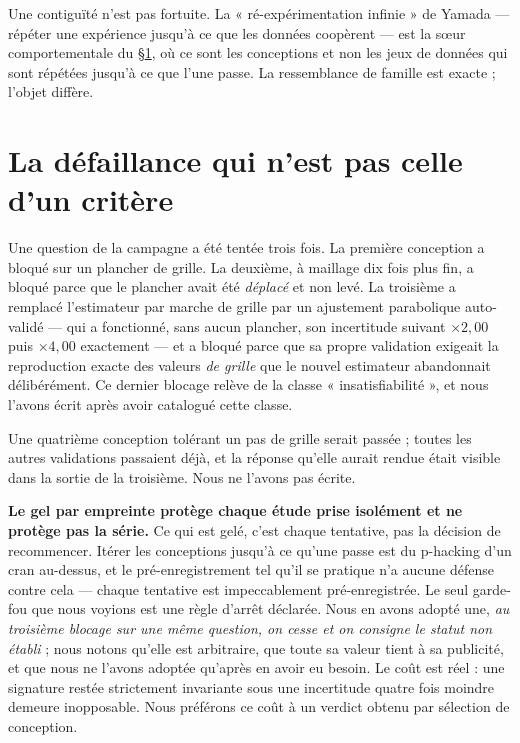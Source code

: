 \documentclass[11pt,a4paper]{article}
\begin{document}
Une contiguïté n'est pas fortuite. La « ré-expérimentation infinie » de Yamada --- répéter une
expérience jusqu'à ce que les données coopèrent --- est la sœur comportementale du
\S\ref{sec:serie}, où ce sont les conceptions et non les jeux de données qui sont répétées
jusqu'à ce que l'une passe. La ressemblance de famille est exacte ; l'objet diffère.

\section{La défaillance qui n'est pas celle d'un critère}
\label{sec:serie}

Une question de la campagne a été tentée trois fois. La première conception a bloqué sur un
plancher de grille. La deuxième, à maillage dix fois plus fin, a bloqué parce que le plancher
avait été \emph{déplacé} et non levé. La troisième a remplacé l'estimateur par marche de
grille par un ajustement parabolique auto-validé --- qui a fonctionné, sans aucun plancher,
son incertitude suivant $\times2{,}00$ puis $\times4{,}00$ exactement --- et a bloqué parce que
sa propre validation exigeait la reproduction exacte des valeurs \emph{de grille} que le nouvel
estimateur abandonnait délibérément. Ce dernier blocage relève de la classe
« insatisfiabilité », et nous l'avons écrit après avoir catalogué cette classe.

Une quatrième conception tolérant un pas de grille serait passée ; toutes les autres
validations passaient déjà, et la réponse qu'elle aurait rendue était visible dans la sortie de
la troisième. Nous ne l'avons pas écrite.

\textbf{Le gel par empreinte protège chaque étude prise isolément et ne protège pas la série.}
Ce qui est gelé, c'est chaque tentative, pas la décision de recommencer. Itérer les conceptions
jusqu'à ce qu'une passe est du p-hacking d'un cran au-dessus, et le pré-enregistrement tel
qu'il se pratique n'a aucune défense contre cela --- chaque tentative est impeccablement
pré-enregistrée. Le seul garde-fou que nous voyions est une règle d'arrêt déclarée. Nous en
avons adopté une, \emph{au troisième blocage sur une même question, on cesse et on consigne le
statut non établi} ; nous notons qu'elle est arbitraire, que toute sa valeur tient à sa
publicité, et que nous ne l'avons adoptée qu'après en avoir eu besoin. Le coût est réel : une
signature restée strictement invariante sous une incertitude quatre fois moindre demeure
inopposable. Nous préférons ce coût à un verdict obtenu par sélection de conception.
\end{document}
